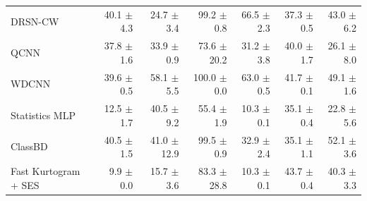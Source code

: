 \begin{table}[p]
\begin{tabular}{lrrrrrr}
DRSN-CW & 40.1 $\pm$ 4.3 & 24.7 $\pm$ 3.4 & 99.2 $\pm$ 0.8 & 66.5 $\pm$ 2.3 & 37.3 $\pm$ 0.5 & 43.0 $\pm$ 6.2 \\
QCNN & 37.8 $\pm$ 1.6 & 33.9 $\pm$ 0.9 & 73.6 $\pm$ 20.2 & 31.2 $\pm$ 3.8 & 40.0 $\pm$ 1.7 & 26.1 $\pm$ 8.0 \\
WDCNN & 39.6 $\pm$ 0.5 & 58.1 $\pm$ 5.5 & 100.0 $\pm$ 0.0 & 63.0 $\pm$ 0.5 & 41.7 $\pm$ 0.1 & 49.1 $\pm$ 1.6 \\
Statistics MLP & 12.5 $\pm$ 1.7 & 40.5 $\pm$ 9.2 & 55.4 $\pm$ 1.9 & 10.3 $\pm$ 0.1 & 35.1 $\pm$ 0.4 & 22.8 $\pm$ 5.6 \\
ClassBD & 40.5 $\pm$ 1.5 & 41.0 $\pm$ 12.9 & 99.5 $\pm$ 0.9 & 32.9 $\pm$ 2.4 & 35.1 $\pm$ 1.1 & 52.1 $\pm$ 3.6 \\
Fast Kurtogram + SES & 9.9 $\pm$ 0.0 & 15.7 $\pm$ 3.6 & 83.3 $\pm$ 28.8 & 10.3 $\pm$ 0.1 & 43.7 $\pm$ 0.4 & 40.3 $\pm$ 3.3 \\
\bottomrule
\end{tabular}
\end{table}
